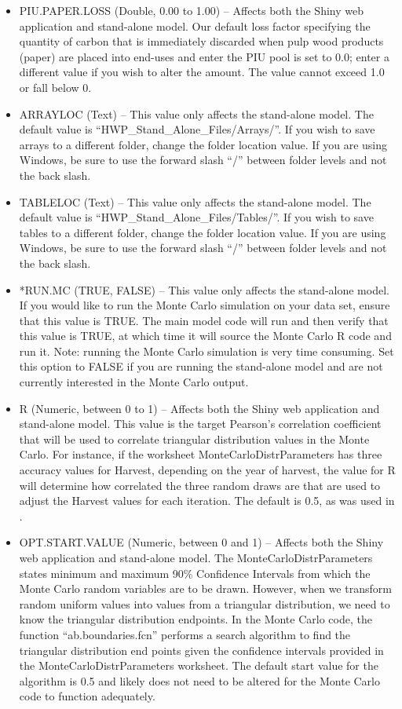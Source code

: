 \documentclass[
  openany]{book}
\begin{document}
\begin{itemize}
\item
  PIU.PAPER.LOSS (Double, 0.00 to 1.00) -- Affects both the Shiny web application and stand-alone model. Our default loss factor specifying the quantity of carbon that is immediately discarded when pulp wood products (paper) are placed into end-uses and enter the PIU pool is set to 0.0; enter a different value if you wish to alter the amount. The value cannot exceed 1.0 or fall below 0.
\item
  ARRAYLOC (Text) -- This value only affects the stand-alone model. The default value is ``HWP\_Stand\_Alone\_Files/Arrays/''. If you wish to save arrays to a different folder, change the folder location value. If you are using Windows, be sure to use the forward slash ``/'' between folder levels and not the back slash.
\item
  TABLELOC (Text) -- This value only affects the stand-alone model. The default value is ``HWP\_Stand\_Alone\_Files/Tables/''. If you wish to save tables to a different folder, change the folder location value. If you are using Windows, be sure to use the forward slash ``/'' between folder levels and not the back slash.
\item
  *RUN.MC (TRUE, FALSE) -- This value only affects the stand-alone model. If you would like to run the Monte Carlo simulation on your data set, ensure that this value is TRUE. The main model code will run and then verify that this value is TRUE, at which time it will source the Monte Carlo R code and run it. Note: running the Monte Carlo simulation is very time consuming. Set this option to FALSE if you are running the stand-alone model and are not currently interested in the Monte Carlo output.
\item
  R (Numeric, between 0 to 1) -- Affects both the Shiny web application and stand-alone model. This value is the target Pearson's correlation coefficient that will be used to correlate triangular distribution values in the Monte Carlo. For instance, if the worksheet MonteCarloDistrParameters has three accuracy values for Harvest, depending on the year of harvest, the value for R will determine how correlated the three random draws are that are used to adjust the Harvest values for each iteration. The default is 0.5, as was used in \textcite{stockmann2012}.
\item
  OPT.START.VALUE (Numeric, between 0 and 1) -- Affects both the Shiny web application and stand-alone model. The MonteCarloDistrParameters states minimum and maximum 90\% Confidence Intervals from which the Monte Carlo random variables are to be drawn. However, when we transform random uniform values into values from a triangular distribution, we need to know the triangular distribution endpoints. In the Monte Carlo code, the function ``ab.boundaries.fcn'' performs a search algorithm to find the triangular distribution end points given the confidence intervals provided in the MonteCarloDistrParameters worksheet. The default start value for the algorithm is 0.5 and likely does not need to be altered for the Monte Carlo code to function adequately.

\end{itemize}
\end{document}
